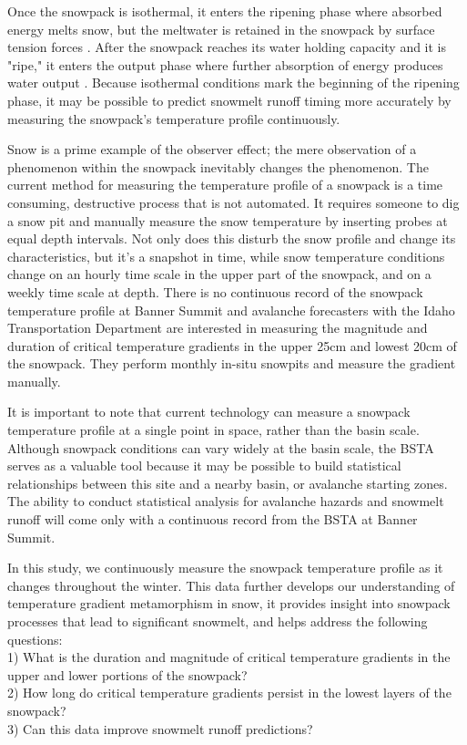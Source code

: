 Once the snowpack is isothermal, it enters the ripening phase where absorbed energy melts snow, but the meltwater is retained in the snowpack by surface tension forces \citep{dingman2015}. After the snowpack reaches its water holding capacity and it is "ripe," it enters the output phase where further absorption of energy produces water output \citep{dingman2015}. Because isothermal conditions mark the beginning of the ripening phase, it may be possible to predict snowmelt runoff timing more accurately by measuring the snowpack's temperature profile continuously.

Snow is a prime example of the observer effect; the mere observation of a phenomenon within the snowpack inevitably changes the phenomenon. The current method for measuring the temperature profile of a snowpack is a time consuming, destructive process that is not automated. It requires someone to dig a snow pit and manually measure the snow temperature by inserting probes at equal depth intervals. Not only does this disturb the snow profile and change its characteristics, but it’s a snapshot in time, while snow temperature conditions change on an hourly time scale in the upper part of the snowpack, and on a weekly time scale at depth. There is no continuous record of the snowpack temperature profile at Banner Summit and avalanche forecasters with the Idaho Transportation Department are interested in measuring the magnitude and duration of critical temperature gradients in the upper 25cm and lowest 20cm of the snowpack. They perform monthly in-situ snowpits and measure the gradient manually.  

It is important to note that current technology can measure a snowpack temperature profile at a single point in space, rather than the basin scale. Although snowpack conditions can vary widely at the basin scale, the BSTA serves as a valuable tool because it may be possible to build statistical relationships between this site and a nearby basin, or avalanche starting zones. The ability to conduct statistical analysis for avalanche hazards and snowmelt runoff will come only with a continuous record from the BSTA at Banner Summit.  

In this study, we continuously measure the snowpack temperature profile as it changes throughout the winter. This data further develops our understanding of temperature gradient metamorphism in snow, it provides insight into snowpack processes that lead to significant snowmelt, and helps address the following questions: \\
1) What is the duration and magnitude of critical temperature gradients in the upper and lower portions of the snowpack? \\
2) How long do critical temperature gradients persist in the lowest layers of the snowpack? \\
3) Can this data improve snowmelt runoff predictions? 

